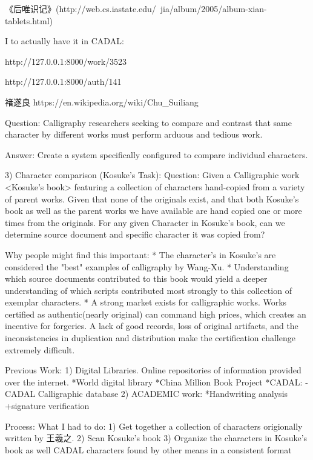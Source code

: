 《后唯识记》(http://web.cs.iastate.edu/~jia/album/2005/album-xian-tablets.html)



I to actually have it in CADAL:

http://127.0.0.1:8000/work/3523

http://127.0.0.1:8000/auth/141

褚遂良
https://en.wikipedia.org/wiki/Chu_Suiliang



    Question:  Calligraphy researchers seeking to compare and contrast that same character by different works must perform arduous and tedious work.
    
    
    Answer:  Create a system specifically configured to compare individual characters.

3)  Character comparison (Kosuke's Task):
    Question:   Given a Calligraphic work <Kosuke's book> featuring a collection of characters hand-copied from a variety of parent works.
                Given that none of the originals exist, and that both Kosuke's book as well as the parent works we have available are hand copied one or more times from the originals.
                For any given Character in Kosuke's book, can we determine source document and specific character it was copied from?
                
Why people might find this important:
    *  The character's in Kosuke's are considered the "best" examples of calligraphy by Wang-Xu.
    *  Understanding which source documents contributed to this book would yield a deeper understanding of which scripts contributed most strongly to this collection of exemplar characters.
    *  A strong market exists for calligraphic works.  Works certified as authentic(nearly original) can command high prices, which creates an incentive for forgeries.  A lack of good records, loss of original artifacts, and the inconsistencies in duplication and distribution make the certification challenge extremely difficult.
    
Previous Work:
    1) Digital Libraries.  Online repositories of information provided over the internet.
        *World digital library
        *China Million Book Project
            *CADAL:
                -CADAL Calligraphic database
    2) ACADEMIC work:
        *Handwriting analysis
            +signature verification
            

Process:  What I had to do:
    1)  Get together a collection of characters origionally written by 王羲之.
    2)  Scan Kosuke's book
    3)  Organize the characters in Kosuke's book as well CADAL characters found by other means in a consistent format
    
